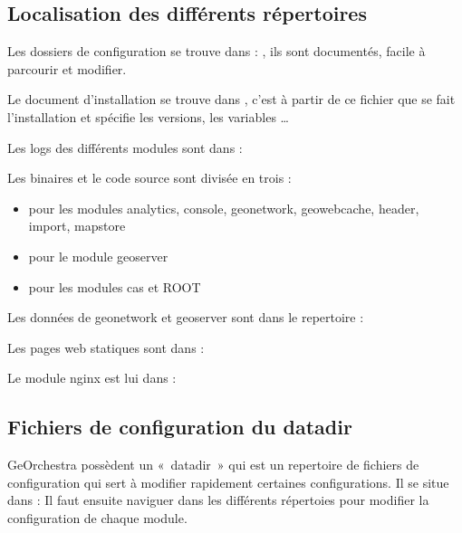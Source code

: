 \documentclass[letterpaper,10pt,french]{sphinxmanual}
\begin{document}
\subsection{Localisation des différents répertoires}
\label{\detokenize{doc_instal/configuration:localisation-des-differents-repertoires}}
\sphinxAtStartPar
Les dossiers de configuration se trouve dans : , ils sont documentés, facile à parcourir et modifier.

\sphinxAtStartPar
Le document d’installation se trouve dans , c’est à partir de ce fichier que se fait l’installation
et spécifie les versions, les variables …

\sphinxAtStartPar
Les logs des différents modules sont dans : 

\sphinxAtStartPar
Les binaires et le code source sont divisée en trois :
\begin{itemize}
\item {} 
\sphinxAtStartPar
{} pour les modules analytics, console, geonetwork, geowebcache, header, import, mapstore

\item {} 
\sphinxAtStartPar
{} pour le module geoserver

\item {} 
\sphinxAtStartPar
{} pour les modules cas et ROOT

\end{itemize}

\sphinxAtStartPar
Les données de geonetwork et geoserver sont dans le repertoire : 

\sphinxAtStartPar
Les pages web statiques sont dans : 

\sphinxAtStartPar
Le module nginx est lui dans : 


\subsection{Fichiers de configuration du datadir}
\label{\detokenize{doc_instal/configuration:fichiers-de-configuration-du-datadir}}
\sphinxAtStartPar
GeOrchestra possèdent un « datadir » qui est un repertoire de fichiers de configuration qui sert à modifier rapidement certaines configurations.
Il se situe dans : 
Il faut ensuite naviguer dans les différents répertoies pour modifier la configuration de chaque module.
\end{document}
